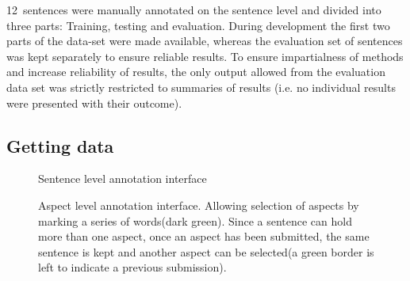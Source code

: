 \documentclass[a4paper,11pt]{kth-mag}
\newcommand{\numAnnotated}{12}
\newif\ifhasStudiedFailures
\begin{document}
\numAnnotated~sentences were manually annotated on the sentence level and divided into three parts: Training, testing and evaluation. During development the first two parts of the data-set were made available, whereas the evaluation set of sentences was kept separately to ensure reliable results. To ensure impartialness of methods and increase reliability of results, the only output allowed from the evaluation data set was strictly restricted to summaries of results (i.e. no individual results were presented with their outcome)\ifhasStudiedFailures, except for when failing instances were explicitly studied after method development was finished\fi.

\newpage
\subsection{Getting data}
\begin{figure}[h]
  \centering
  \caption{Sentence level annotation interface}
  \label{fig:annotate_sentence}
\end{figure}

\begin{figure}[h]
  \centering
  \caption{Aspect level annotation interface. Allowing selection of aspects by marking a series of words(dark green). Since a sentence can hold more than one aspect, once an aspect has been submitted, the same sentence is kept and another aspect can be selected(a green border is left to indicate a previous submission).}
  \label{fig:annotate_aspect}
\end{figure}
\end{document}
